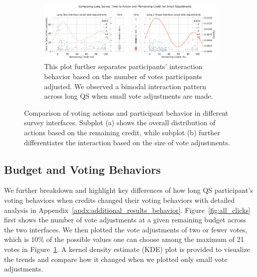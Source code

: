 \begin{figure}[h]
    \begin{subfigure}[b]{\textwidth}
        \centering
        \includegraphics[width=\textwidth]{content/image/results/small_adjustments_plot.pdf}
        \caption{This plot further separates participants' interaction behavior based on the number of votes participants adjusted. We observed a bimodal interaction pattern across long QS when small vote adjustments are made.}

        \label{fig:small_clicks}
    \end{subfigure}
    
    \caption{Comparison of voting actions and participant behavior in different survey interfaces. Subplot (a) shows the overall distribution of actions based on the remaining credit, while subplot (b) further differentiates the interaction based on the size of vote adjustments.}
    \label{fig:combined_voting_behavior}
\end{figure}


\subsection{Budget and Voting Behaviors}
We further breakdown and highlight key differences of how long QS participant's voting behaviors when credits changed their voting behaviors with detailed analysis in Appendix~\ref{apdx:additional_results_behavior}. Figure~\ref{fig:all_clicks} first shows the number of vote adjustments at a given remaining budget across the two interfaces. We then plotted the vote adjustments of two or fewer votes, which is $10\%$ of the possible values one can choose among the maximum of 21 votes in Figure~\ref{fig:small_clicks}. A kernel density estimate (KDE) plot is provided to visualize the trends and compare how it changed when we plotted only small vote adjustments.

